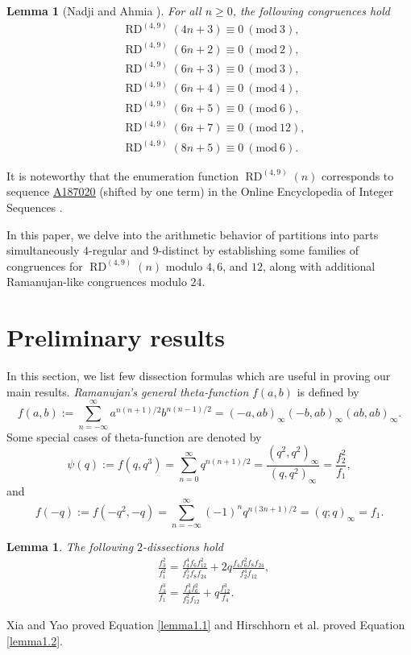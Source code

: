 \documentclass[12pt]{amsart}
\newcommand{\seqnum}[1]{\href{http://oeis.org/#1}{\underline{#1}}}
\DeclareMathOperator {\myRD}{RD}
\theoremstyle{plain}
\newtheorem{lemma}[theorem]{Lemma}
\theoremstyle{definition}
\begin{document}
\begin{lemma}[Nadji and Ahmia \cite{NadjiAhmia2024}] For all $n \geq 0$, the following congruences hold \begin{align*} 
& \myRD^{(4, 9)}(4n+3) \equiv 0 \ (\mathrm{mod} \ 3),\\
& \myRD^{(4, 9)}(6n+2) \equiv 0 \ (\mathrm{mod} \ 2),\\
& \myRD^{(4, 9)}(6n+3) \equiv 0 \ (\mathrm{mod} \ 3),\\ 
& \myRD^{(4, 9)}(6n+4) \equiv 0 \ (\mathrm{mod} \ 4),\\ 
& \myRD^{(4, 9)}(6n+5) \equiv 0 \ (\mathrm{mod} \ 6),\\
& \myRD^{(4, 9)}(6n+7) \equiv 0 \ (\mathrm{mod} \ 12),\\
& \myRD^{(4, 9)}(8n+5) \equiv 0 \ (\mathrm{mod} \ 6). 
\end{align*} \end{lemma}
It is noteworthy that the enumeration function $\myRD^{(4, 9)}(n)$ corresponds to sequence \seqnum{A187020} (shifted by one term) in the Online Encyclopedia of Integer Sequences \cite{OEIS}.

In this paper, we delve into the arithmetic behavior of partitions into parts simultaneously $4$-regular and $9$-distinct by establishing some families of congruences for $\myRD^{(4, 9)}(n)$ modulo $4, 6$, and $12$, along with additional Ramanujan-like congruences modulo $24$.

\section{Preliminary results}
\label{Preres}
In this section, we list few dissection formulas which are useful in proving our main results. \emph{Ramanujan's general theta-function} $f(a,b)$ \cite[p. 34, 18.1]{Berndt1991} is defined by
\[
f(a,b):=\sum_{n=-\infty}^{\infty}a^{n(n+1)/2}b^{n(n-1)/2}=(-a,ab)_{\infty}(-b,ab)_{\infty}(ab,ab)_{\infty}.
\]
Some special cases of theta-function are denoted by
\[
\psi(q):=f(q,q^{3})=\sum_{n=0}^{\infty}q^{n(n+1)/2}=\dfrac{(q^{2},q^{2})_{\infty}}{(q,q^{2})_{\infty}}=\dfrac{f_{2}^{2}}{f_{1}},
\]
and
\[
f(-q):=f(-q^{2},-q)=\sum_{n=-\infty}^{\infty}(-1)^{n}q^{n(3n+1)/2}=(q;q)_{\infty}=f_{1}.
\]

\begin{lemma} \label{lemma1} The following $2$-dissections hold
\begin{align}
&\frac{f_{3}^{2}}{f_{1}^{2}}=\frac{f_{4}^{4}f_{6}f_{12}^{2}}{f_{2}^{5}f_{8}f_{24}}+2q\frac{f_{4}f_{6}^{2}f_{8}f_{24}}{f_{2}^{4}f_{12}}, \label{lemma1.1}\\
&\frac{f_{3}^{3}}{f_{1}}=\frac{f_{4}^{3}f_{6}^{2}}{f_{2}^{2}f_{12}}+q\frac{f_{12}^{3}}{f_{4}}. \label{lemma1.2}
\end{align}
\end{lemma}
Xia and Yao \cite{XY2} proved Equation \eqref{lemma1.1} and Hirschhorn et al. \cite{HGB} proved Equation \eqref{lemma1.2}.
\end{document}

